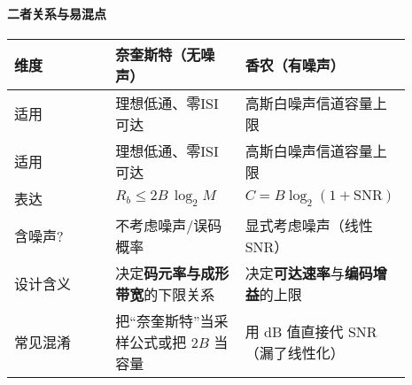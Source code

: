 \documentclass[lang=cn,newtx,10pt,scheme=chinese]{../../elegantbook}
\begin{document}
\paragraph{二者关系与易混点}
{\small\begin{longtable}{|p{0.25\linewidth}|p{0.32\linewidth}|p{0.32\linewidth}|}
\hline
    \textbf{维度} & \textbf{奈奎斯特（无噪声）} & \textbf{香农（有噪声）} \\
\hline
适用 & 理想低通、零ISI可达 & 高斯白噪声信道容量上限 \\
适用 & 理想低通、零ISI可达 & 高斯白噪声信道容量上限 \\
\hline
表达 & $R_b\le 2B\,\log_2M$ & $C=B\log_2(1+\mathrm{SNR})$ \\
\hline
含噪声? & 不考虑噪声/误码概率 & 显式考虑噪声（线性 SNR） \\
\hline
设计含义 & 决定\textbf{码元率与成形带宽}的下限关系 & 决定\textbf{可达速率}与\textbf{编码增益}的上限 \\
\hline
常见混淆 & 把“奈奎斯特”当采样公式或把 $2B$ 当容量 & 用 dB 值直接代 SNR（漏了线性化） \\
\hline
\end{longtable}}
\end{document}
